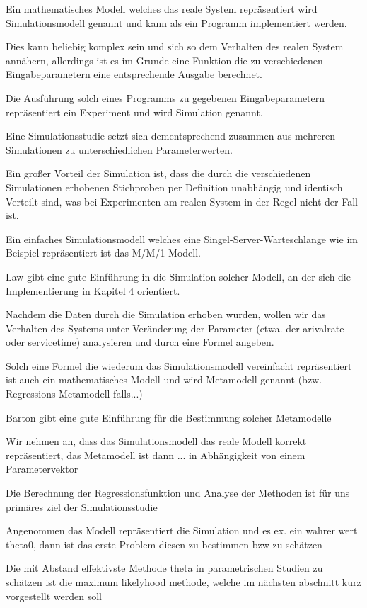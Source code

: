 Ein mathematisches Modell welches das reale System repräsentiert wird Simulationsmodell genannt und kann als ein Programm implementiert werden.

Dies kann beliebig komplex sein und sich so dem Verhalten des realen System annähern, allerdings ist es im Grunde eine Funktion die zu verschiedenen Eingabeparametern eine entsprechende Ausgabe berechnet.

Die Ausführung solch eines Programms zu gegebenen Eingabeparametern repräsentiert ein Experiment und wird Simulation genannt.

Eine Simulationsstudie setzt sich dementsprechend zusammen aus mehreren Simulationen zu unterschiedlichen Parameterwerten.

Ein großer Vorteil der Simulation ist, dass die durch die verschiedenen Simulationen erhobenen Stichproben per Definition unabhängig und identisch Verteilt sind, was bei Experimenten am realen System in der Regel nicht der Fall ist.

Ein einfaches Simulationsmodell welches eine Singel-Server-Warteschlange wie im Beispiel repräsentiert ist das M/M/1-Modell.

Law gibt eine gute Einführung in die Simulation solcher Modell, an der sich die Implementierung in Kapitel 4 orientiert.

Nachdem die Daten durch die Simulation erhoben wurden, wollen wir das Verhalten des Systems unter Veränderung der Parameter (etwa. der arivalrate oder servicetime) analysieren und durch eine Formel angeben.

Solch eine Formel die wiederum das Simulationsmodell vereinfacht repräsentiert ist auch ein mathematisches Modell und wird Metamodell genannt (bzw. Regressions Metamodell falls...)

Barton gibt eine gute Einführung für die Bestimmung solcher Metamodelle

Wir nehmen an, dass das Simulationsmodell das reale Modell korrekt repräsentiert, das Metamodell ist dann ... in Abhängigkeit von einem Parametervektor

Die Berechnung der Regressionsfunktion und Analyse der Methoden ist für uns primäres ziel der Simulationsstudie

Angenommen das Modell repräsentiert die Simulation und es ex. ein wahrer wert theta0, dann ist das erste Problem diesen zu bestimmen bzw zu schätzen

Die mit Abstand effektivste Methode theta in parametrischen Studien zu schätzen ist die maximum likelyhood methode, welche im nächsten abschnitt kurz vorgestellt werden soll

